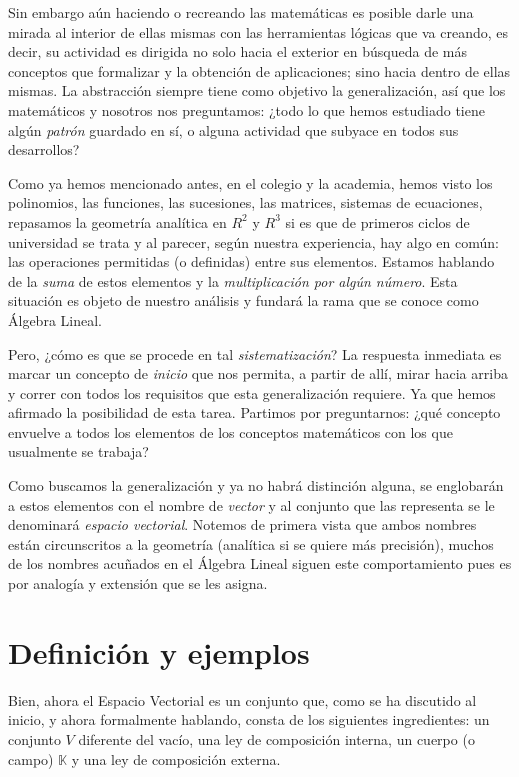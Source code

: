 \documentclass[b5paper, 11pt]{book}
\newcommand{\0}{\mathbf{0}}
\theoremstyle{estiloB}
\theoremstyle{estiloC}
\theoremstyle{estiloD}
\theoremstyle{estiloE}
\begin{document}
Sin embargo aún haciendo o recreando las matemáticas es posible darle una mirada al interior de ellas mismas con las herramientas lógicas que va creando, es decir, su actividad es dirigida no solo hacia el exterior en búsqueda de más conceptos que formalizar y la obtención de aplicaciones; sino hacia dentro de ellas mismas. La abstracción siempre tiene como objetivo la generalización, así que los matemáticos y nosotros nos preguntamos: ¿todo lo que hemos estudiado tiene algún \textit{patrón} guardado en sí, o alguna actividad que subyace en todos sus desarrollos?

Como ya hemos mencionado antes, en el colegio y la academia, hemos visto los polinomios, las funciones, las sucesiones, las matrices, sistemas de ecuaciones, repasamos la geometría analítica en $R^{2}$ y $R^{3}$ si es que de primeros ciclos de universidad se trata y al parecer, según nuestra experiencia, hay algo en común: las operaciones permitidas (o definidas) entre sus elementos. Estamos hablando de la \textit{suma} de estos elementos y la \textit{multiplicación por algún número}. Esta situación es objeto de nuestro análisis y fundará la rama que se conoce como Álgebra Lineal.

Pero, ¿cómo es que se procede en tal \textit{sistematización}? La respuesta inmediata es marcar un concepto de \textit{inicio} que nos permita, a partir de allí, mirar hacia arriba y correr con todos los requisitos que esta generalización requiere. Ya que hemos afirmado la posibilidad de esta tarea. Partimos por preguntarnos: ¿qué concepto envuelve a todos los elementos de los conceptos matemáticos con los que usualmente se trabaja? 

Como buscamos la generalización y ya no habrá distinción alguna, se englobarán a estos elementos con el nombre de \textit{vector} y al conjunto que las representa se le denominará \textit{espacio vectorial}. Notemos de primera vista que ambos nombres están circunscritos a la geometría (analítica si se quiere más precisión), muchos de los nombres acuñados en el Álgebra Lineal siguen este comportamiento pues es por analogía y extensión que se les asigna.

\section{Definición y ejemplos}
Bien, ahora el Espacio Vectorial es un conjunto que, como se ha discutido al inicio, y ahora formalmente hablando, consta de los siguientes ingredientes: un conjunto $V$ diferente del vacío, una ley de composición interna, un cuerpo (o campo) $\mathds{K}$ y una ley de composición externa.
\end{document}
